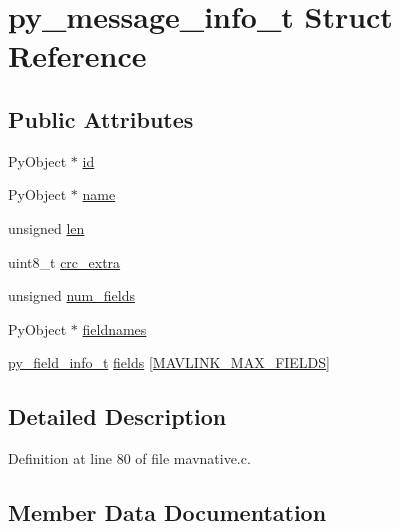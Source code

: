 \hypertarget{structpy__message__info__t}{}\section{py\+\_\+message\+\_\+info\+\_\+t Struct Reference}
\label{structpy__message__info__t}
\subsection*{Public Attributes}
\begin{DoxyCompactItemize}
\item 
Py\+Object $\ast$ \mbox{\hyperlink{structpy__message__info__t_abd5a280b35c6534c5089c17f98712515}{id}}
\item 
Py\+Object $\ast$ \mbox{\hyperlink{structpy__message__info__t_a87ac2fb875bbd6ec271f45acf67406cc}{name}}
\item 
unsigned \mbox{\hyperlink{structpy__message__info__t_a646d85370d95c920c9191a26bfffec98}{len}}
\item 
uint8\+\_\+t \mbox{\hyperlink{structpy__message__info__t_a8cbb192018d74ba6d9ab31e2fd605cb9}{crc\+\_\+extra}}
\item 
unsigned \mbox{\hyperlink{structpy__message__info__t_a65574d6cccbb71271cfb45f491bd678d}{num\+\_\+fields}}
\item 
Py\+Object $\ast$ \mbox{\hyperlink{structpy__message__info__t_af1984cbd790c723d78663f15cf560542}{fieldnames}}
\item 
\mbox{\hyperlink{structpy__field__info__t}{py\+\_\+field\+\_\+info\+\_\+t}} \mbox{\hyperlink{structpy__message__info__t_a6c8f190efd318675b963df07e77d5586}{fields}} \mbox{[}\mbox{\hyperlink{include__v2_80_2mavlink__types_8h_a27984b8945d505a56168731dc3cac63a}{M\+A\+V\+L\+I\+N\+K\+\_\+\+M\+A\+X\+\_\+\+F\+I\+E\+L\+DS}}\mbox{]}
\end{DoxyCompactItemize}


\subsection{Detailed Description}


Definition at line 80 of file mavnative.\+c.



\subsection{Member Data Documentation}
\mbox{\label{structpy__message__info__t_a8cbb192018d74ba6d9ab31e2fd605cb9}} 
